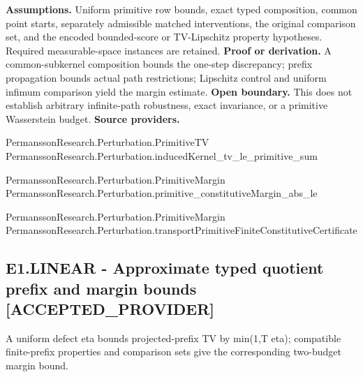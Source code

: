 \documentclass[11pt,a4paper]{article}
\begin{document}
\textbf{Assumptions.} Uniform primitive row bounds, exact typed composition, common point starts, separately admissible matched interventions, the original comparison set, and the encoded bounded-score or TV-Lipschitz property hypotheses. Required measurable-space instances are retained.
\textbf{Proof or derivation.} A common-subkernel composition bounds the one-step discrepancy; prefix propagation bounds actual path restrictions; Lipschitz control and uniform infimum comparison yield the margin estimate.
\textbf{Open boundary.} This does not establish arbitrary infinite-path robustness, exact invariance, or a primitive Wasserstein budget.
\textbf{Source providers.}
{\footnotesize\raggedright PermanssonRe\allowbreak{}search.Pertu\allowbreak{}rbation.Prim\allowbreak{}itiveTV\\ PermanssonRe\allowbreak{}search.Pertu\allowbreak{}rbation.indu\allowbreak{}cedKernel\_tv\allowbreak{}\_le\_primitiv\allowbreak{}e\_sum\par}
{\footnotesize\raggedright PermanssonRe\allowbreak{}search.Pertu\allowbreak{}rbation.Prim\allowbreak{}itiveMargin\\ PermanssonRe\allowbreak{}search.Pertu\allowbreak{}rbation.prim\allowbreak{}itive\_consti\allowbreak{}tutiveMargin\allowbreak{}\_abs\_le\par}
{\footnotesize\raggedright PermanssonRe\allowbreak{}search.Pertu\allowbreak{}rbation.Prim\allowbreak{}itiveMargin\\ PermanssonRe\allowbreak{}search.Pertu\allowbreak{}rbation.tran\allowbreak{}sportPrimiti\allowbreak{}veFiniteCons\allowbreak{}titutiveCert\allowbreak{}ificate\par}
\subsection*{E1.LINEAR - Approximate typed quotient prefix and margin bounds [ACCEPTED\_PROVIDER]}
A uniform defect eta bounds projected-prefix TV by min(1,T eta); compatible finite-prefix properties and comparison sets give the corresponding two-budget margin bound.
\end{document}
